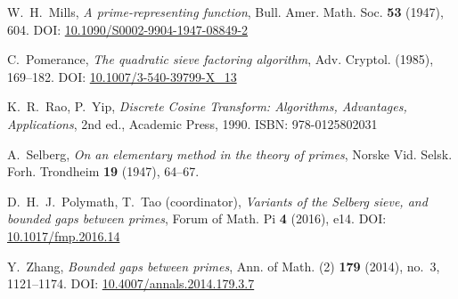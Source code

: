 \documentclass[12pt]{article}
\begin{document}
\begin{thebibliography}{99}
W.~H.~Mills, 
\textit{A prime-representing function}, 
Bull. Amer. Math. Soc. \textbf{53} (1947), 604. 
DOI: \href{https://doi.org/10.1090/S0002-9904-1947-08849-2}{10.1090/S0002-9904-1947-08849-2}

C.~Pomerance, 
\textit{The quadratic sieve factoring algorithm}, 
Adv. Cryptol. (1985), 169--182. 
DOI: \href{https://doi.org/10.1007/3-540-39799-X\_13}{10.1007/3-540-39799-X\_13}

K.~R.~Rao, P.~Yip, 
\textit{Discrete Cosine Transform: Algorithms, Advantages, Applications}, 
2nd ed., Academic Press, 1990. 
ISBN: 978-0125802031

A.~Selberg, 
\textit{On an elementary method in the theory of primes}, 
Norske Vid. Selsk. Forh. Trondheim \textbf{19} (1947), 64--67.

D.~H.~J.~Polymath, T.~Tao (coordinator),
\textit{Variants of the Selberg sieve, and bounded gaps between primes}, 
Forum of Math. Pi \textbf{4} (2016), e14. 
DOI: \href{https://doi.org/10.1017/fmp.2016.14}{10.1017/fmp.2016.14}

Y.~Zhang, 
\textit{Bounded gaps between primes}, 
Ann. of Math. (2) \textbf{179} (2014), no.~3, 1121--1174. 
DOI: \href{https://doi.org/10.4007/annals.2014.179.3.7}{10.4007/annals.2014.179.3.7}

\end{thebibliography}
\end{document}
